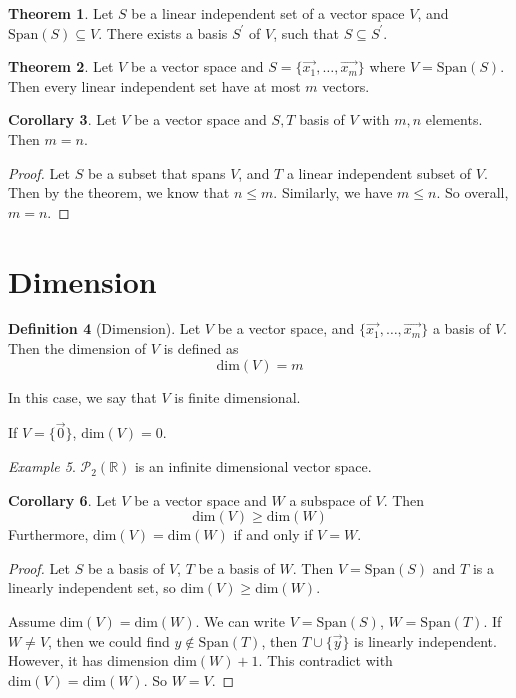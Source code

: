 \documentclass{article}
\theoremstyle{definition}
\newtheorem{theorem}{Theorem}[section]
\newtheorem{corollary}[theorem]{Corollary}
\newtheorem{definition}[theorem]{Definition}
\theoremstyle{remark}
\newtheorem{example}[theorem]{Example}
\begin{document}
\begin{theorem}
    Let $S$ be a linear independent set of a vector space $V$, and $\text{Span}(S)\subseteq V$.
    There exists a basis $S^{'}$ of $V$, such that $S\subseteq S^{'}$.
\end{theorem}

\begin{theorem}
    Let $V$ be a vector space and $S=\{\vec{x_1},\dots,\vec{x_m}\}$ where $V=\text{Span}(S)$. Then every linear independent set have at most $m$ vectors.
\end{theorem}

\begin{corollary}
    Let $V$ be a vector space and $S, T$ basis of $V$ with $m,n$ elements. Then $m=n$.
\end{corollary}

\begin{proof}
    Let $S$ be a subset that spans $V$, and $T$ a linear independent subset of $V$. Then by the theorem, we know that $n\leq m$. Similarly, we have $m\leq n$. So overall, $m=n$.
\end{proof}

\section{Dimension}

\begin{definition}[Dimension]
    Let $V$ be a vector space, and  $\{\vec{x_1},\dots,\vec{x_m}\}$ a basis of $V$. Then the dimension of $V$ is defined as 
    \[
    \text{dim}(V)=m
    \]

    In this case, we say that $V$ is finite dimensional.

    If $V=\{\vec{0}\}$, $\text{dim}(V)=0$.
\end{definition}

\begin{example}
    $\mathcal{P}_2(\mathbb{R})$ is an infinite dimensional vector space.
\end{example}

\begin{corollary}
    Let $V$ be a vector space and $W$ a subspace of $V$. Then
    \[
    \text{dim}(V)\geq\text{dim}(W)
    \]
    Furthermore, $ \text{dim}(V)=\text{dim}(W)$ if and only if $V=W$.
\end{corollary}

\begin{proof}
    Let $S$ be a basis of $V$, $T$ be a basis of $W$. Then $V=\text{Span}(S)$ and $T$ is a linearly independent set, so $\text{dim}(V)\geq\text{dim}(W)$.

    Assume $\text{dim}(V)=\text{dim}(W)$.
    We can write $V=\text{Span}(S)$, $W=\text{Span}(T)$.
    If $W\neq V$, then we could find $y\notin \text{Span}(T)$, then $T\cup \{\vec{y}\}$ is linearly independent. 
    However, it has dimension $\text{dim}(W)+1$.
    This contradict with $\text{dim}(V)=\text{dim}(W)$.
    So $W=V$.
\end{proof}
\end{document}
